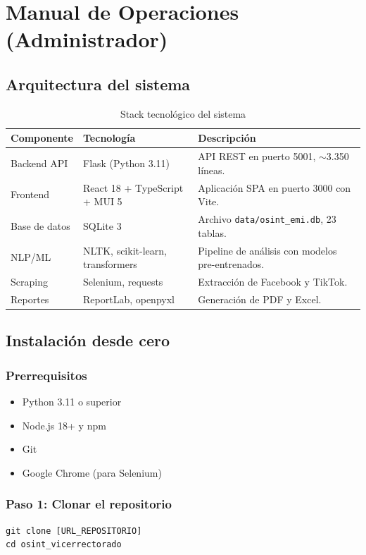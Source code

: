 \documentclass[12pt,a4paper]{article}
\begin{document}
\section{Manual de Operaciones (Administrador)}

\subsection{Arquitectura del sistema}
\begin{table}[H]
\centering
\begin{tabularx}{\textwidth}{l l X}
\toprule
\textbf{Componente} & \textbf{Tecnología} & \textbf{Descripción} \\
\midrule
Backend API & Flask (Python 3.11) & API REST en puerto 5001, $\sim$3.350 líneas. \\
Frontend & React 18 + TypeScript + MUI 5 & Aplicación SPA en puerto 3000 con Vite. \\
Base de datos & SQLite 3 & Archivo \texttt{data/osint\_emi.db}, 23 tablas. \\
NLP/ML & NLTK, scikit-learn, transformers & Pipeline de análisis con modelos pre-entrenados. \\
Scraping & Selenium, requests & Extracción de Facebook y TikTok. \\
Reportes & ReportLab, openpyxl & Generación de PDF y Excel. \\
\bottomrule
\end{tabularx}
\caption{Stack tecnológico del sistema}
\end{table}

\subsection{Instalación desde cero}

\subsubsection{Prerrequisitos}
\begin{itemize}
  \item Python 3.11 o superior
  \item Node.js 18+ y npm
  \item Git
  \item Google Chrome (para Selenium)
\end{itemize}

\subsubsection{Paso 1: Clonar el repositorio}
\begin{verbatim}
git clone [URL_REPOSITORIO]
cd osint_vicerrectorado
\end{verbatim}
\end{document}
